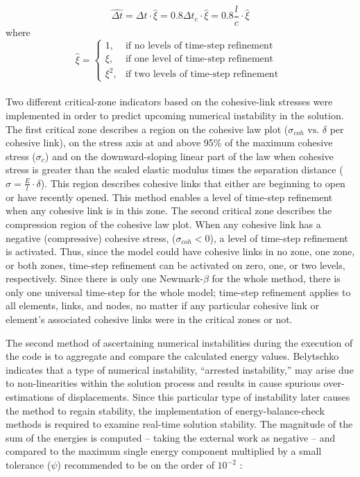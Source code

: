 \documentclass[12pt,a4paper]{article}
\begin{document}
\begin{equation}
\hat{\Delta t} = \Delta t \cdot \hat{\xi} = 0.8\Delta t_{c} \cdot \hat{\xi} = 0.8 \frac{l}{c} \cdot \hat{\xi}
\label{eq:deltaT}
\end{equation}
where
\begin{equation}
\hat{\xi} = \begin{cases} 1, & \mbox{if no levels of time-step refinement} \\ \xi, & \mbox{if one level of time-step refinement } \\ \xi^{2}, & \mbox{if  two levels of time-step refinement }\end{cases}
\label{eq:xiHat}
\end{equation}\\

Two different critical-zone indicators based on the cohesive-link stresses were implemented in order to predict upcoming numerical instability in the solution. The first critical zone describes a region on the cohesive law plot ($\sigma_{coh} \mbox{ vs. } \delta$ per cohesive link), on the stress axis at and above 95\% of the maximum cohesive stress ($\sigma_{c}$) and on the downward-sloping linear part of the law when cohesive stress is greater than the scaled elastic modulus times the separation distance ($\sigma = \frac{E}{l}\cdot \delta$). This region describes cohesive links that either are beginning to open or have recently opened. This method enables a level of time-step refinement when any cohesive link is in this zone. The second critical zone describes the compression region of the cohesive law plot. When any cohesive link has a negative (compressive) cohesive stress, ($\sigma_{coh} < 0$), a level of time-step refinement is activated. Thus, since the model could have cohesive links in no zone, one zone, or both zones, time-step refinement can be activated on zero, one, or two levels, respectively. Since there is only one Newmark-$\beta$ for the whole method, there is only one universal time-step for the whole model; time-step refinement applies to all elements, links, and nodes, no matter if any particular cohesive link or element's associated cohesive links were in the critical zones or not.

The second method of ascertaining numerical instabilities during the execution of the code is to aggregate and compare the calculated energy values. Belytschko \cite{Belytschko2000} indicates that a type of numerical instability, ``arrested instability,'' may arise due to non-linearities within the solution process and results in cause spurious over-estimations of displacements. Since this particular type of instability later causes the method to regain stability, the implementation of energy-balance-check methods is required to examine real-time solution stability. The magnitude of the sum of the energies is computed -- taking the external work as negative -- and compared to the maximum single energy component multiplied by a small tolerance ($\psi$) recommended to be on the order of $10^{-2}$ :
\end{document}
